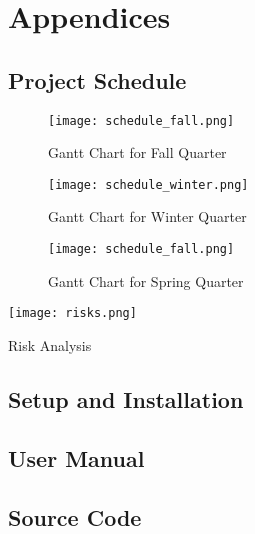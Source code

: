 \chapter{Appendices}

\section{Project Schedule}
\begin{figure}[H]
	\centering
	\texttt{[image: schedule\_fall.png]}
	\caption{Gantt Chart for Fall Quarter}
\end{figure}

\begin{figure}[H]
	\centering
	\texttt{[image: schedule\_winter.png]}
	\caption{Gantt Chart for Winter Quarter}
\end{figure}

\begin{figure}[H]
	\centering
	\texttt{[image: schedule\_fall.png]}
	\caption{Gantt Chart for Spring Quarter}
\end{figure}

\begin{table}[H]
	\centering
	\texttt{[image: risks.png]}
	\caption{Risk Analysis}
\end{table}


\section{Setup and Installation}

\section{User Manual}

\section{Source Code}